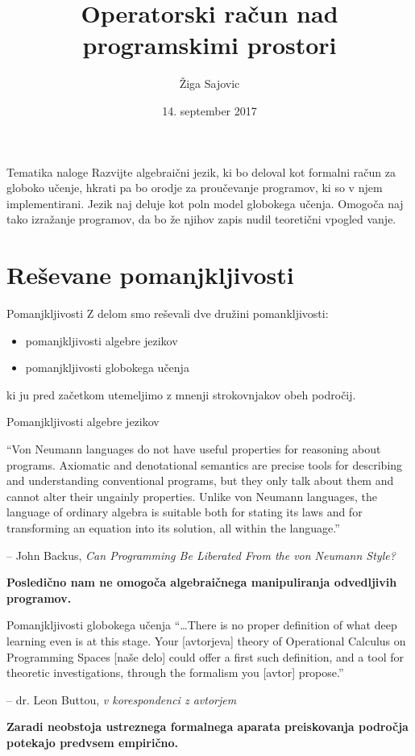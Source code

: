 \documentclass{beamer}
\title{Operatorski račun nad programskimi prostori}
\date{14. september 2017}
\author{Žiga Sajovic}
\institute{Univerza v Ljubljani, Fakulteta za Računlništvo in Informatiko}
\begin{document}
\maketitle

\begin{frame}{Tematika naloge}
Razvijte algebraični jezik, ki bo deloval kot formalni račun za globoko učenje, hkrati pa bo orodje za proučevanje programov, ki so v njem implementirani. Jezik naj deluje kot poln model globokega učenja. Omogoča naj tako izražanje programov, da bo že njihov zapis nudil teoretični vpogled vanje.
\end{frame}
\section{Reševane pomanjkljivosti}

\begin{frame}{Pomanjkljivosti}
Z delom smo reševali dve družini pomankljivosti:
\begin{itemize}
\item
pomanjkljivosti algebre jezikov
\item
pomanjkljivosti globokega učenja
\end{itemize}
ki ju pred začetkom utemeljimo z mnenji strokovnjakov obeh področij.
\end{frame}

\begin{frame}{Pomanjkljivosti algebre jezikov}

``Von Neumann languages do not have useful properties for reasoning about programs. Axiomatic and denotational semantics are precise tools for describing and understanding conventional programs, but they only talk about them and cannot alter their ungainly properties. Unlike von Neumann languages, the language of ordinary algebra is suitable both for stating its laws and for transforming an equation into its solution, all within the language.''

-- John Backus, \textit{Can Programming Be Liberated From the von Neumann Style?}

\textbf{Posledično nam ne omogoča algebraičnega manipuliranja odvedljivih programov.}

\end{frame}

\begin{frame}{Pomanjkljivosti globokega učenja}
``\dots There is no proper definition of what deep learning even is at this stage. Your [avtorjeva] theory of Operational Calculus on Programming Spaces [naše delo] could offer a first such definition, and a tool for theoretic investigations, through the formalism you [avtor] propose.''

-- dr. Leon Buttou, \textit{v korespondenci z avtorjem}

\textbf{Zaradi neobstoja ustreznega formalnega aparata preiskovanja področja potekajo predvsem empirično.}

\end{frame}
\end{document}
